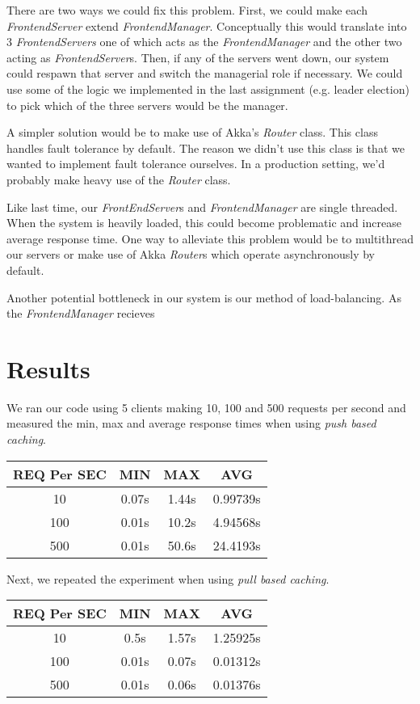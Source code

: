 \documentclass[11pt]{article}
\begin{document}
There are two ways we could fix this problem. First, we could make
each \emph{FrontendServer} extend \emph{FrontendManager}.
Conceptually this would translate into 3 \emph{FrontendServers} one of
which acts as the \emph{FrontendManager} and the other two acting as
\emph{FrontendServer}s.  Then, if any of the servers went down, our
system could respawn that server and switch the managerial role if
necessary.  We could use some of the logic we implemented in the last
assignment (e.g. leader election) to pick which of the three servers
would be the manager.

A simpler solution would be to make use of Akka's \emph{Router}
class.  This class handles fault tolerance by default.  The reason we
didn't use this class is that we wanted to implement fault tolerance
ourselves.  In a production setting, we'd probably make heavy use of
the \emph{Router} class.

Like last time, our \emph{FrontEndServer}s and \emph{FrontendManager}
are single threaded.  When the system is heavily loaded, this could
become problematic and increase average response time.  One way to
alleviate this problem would be to multithread our servers or make use
of Akka \emph{Router}s which operate asynchronously by default.

Another potential bottleneck in our system is our method of
load-balancing.  As the \emph{FrontendManager} recieves

\section{Results}
We ran our code using 5 clients making 10, 100 and 500 requests per
second and measured the min, max and average response
times when using \emph{push based caching}.

\begin{tabular}{c|c|c|c}
  REQ Per SEC & MIN & MAX & AVG \\
  \hline
  10  & 0.07s & 1.44s & 0.99739s \\
  100 & 0.01s & 10.2s & 4.94568s \\
  500 & 0.01s & 50.6s & 24.4193s \\
\end{tabular}

Next, we repeated the experiment when using \emph{pull based caching}.

\begin{tabular}{c|c|c|c}
  REQ Per SEC & MIN & MAX & AVG \\
  \hline
  10  & 0.5s  & 1.57s & 1.25925s \\
  100 & 0.01s & 0.07s & 0.01312s \\
  500 & 0.01s & 0.06s & 0.01376s \\
\end{tabular}
\end{document}
